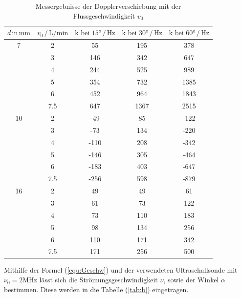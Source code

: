 \begin{table}
    \centering
    \caption{Messergebnisse der Dopplerverschiebung mit der Flussgeschwindigkeit $v_0$} 
    \begin{tabular}{c | c c c c}
        \toprule
        {$d \, \text{in} \, \si{\milli\meter} $} & {$v_0 \, / \, \si{\liter\per\minute}$} & {$\text{k bei 15°} \, / \, \si{\hertz}$} & {$\text{k  bei 30°} \, / \, \si{\hertz}$} & {$\text{k bei 60°} \, / \, \si{\hertz}$} \\
        \midrule
    7 &    2     &      55    &      195   &      378    \\
     &    3      &     146    &     342    &     647   \\
     &    4      &     244    &     525    &     989   \\
     &    5      &     354    &     732    &     1385   \\
     &    6      &     452    &     964    &     1843   \\
     &    7.5    &     647    &     1367   &     2515   \\
    \midrule 
    10 &    2     &      -49  &       85     &     -122 \\
     &    3       &    -73    &     134      &   -220 \\
     &    4       &    -110   &     208      &   -342 \\
     &    5       &    -146   &     305      &   -464 \\
     &    6       &    -183   &     403      &   -647 \\
     &    7.5     &    -256   &     598      &   -879 \\
    \midrule 
    16 &    2      &     49  &        49   &       61 \\
     &    3        &   61    &      73     &     122 \\
     &    4        &   73    &      110    &     183 \\
     &    5        &   98    &      134    &     256 \\
     &    6        &   110   &      171    &     342 \\
     &    7.5      &   171   &      256    &     500 \\
        \bottomrule
    \end{tabular}
    \label{tab:a}
\end{table}

\noindent
Mithilfe der Formel (\ref{equ:Geschw}) und der verwendeten Ultraschallsonde mit $\nu_0 = 2 \si{\mega\hertz} $ lässt sich die Strömungsgeschwindigkeit $\nu$, sowie der Winkel $\alpha$ bestimmen. Diese werden in die Tabelle (\ref{tab:b}) eingetragen.


